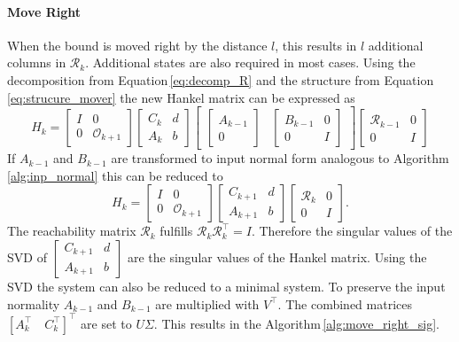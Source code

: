 \documentclass[doctype=mastersthesis,BCOR=15mm,biblatex]{ldvbook}%
\newcommand{\R}{\mathcal{R}} %
\newcommand{\Ob}{\mathcal{O}} %
\newcommand{\eye}{I} %
\begin{document}
\paragraph{Move Right}
When the bound is moved right by the distance $l$, this results in $l$ additional columns in $\R_k$.
Additional states are also required in most cases.
Using the decomposition from Equation\,\ref{eq:decomp_R} and the structure from Equation\,\ref{eq:strucure_mover} the new Hankel matrix can be expressed as
\begin{equation}
	H_k = 
	\begin{bmatrix}
	\eye & 0\\ 0 &\Ob_{k+1}
	\end{bmatrix}
	\begin{bmatrix}
	C_{k} & d\\
	A_{k} & b
	\end{bmatrix}
	\begin{bmatrix}
	\begin{bmatrix}
	A_{k-1} \\
	0
	\end{bmatrix}&
	\begin{bmatrix}
		B_{k-1}&0\\
		0&\eye
	\end{bmatrix}
	\end{bmatrix}
	\begin{bmatrix}
	\R_{k-1} & 0\\ 0& \eye
	\end{bmatrix}
\end{equation}
If $A_{k-1}$ and $B_{k-1}$ are transformed to input normal form analogous to Algorithm\,\ref{alg:inp_normal} this can be reduced to 
\begin{equation}
H_k = 
\begin{bmatrix}
\eye & 0\\ 0 &\Ob_{k+1}
\end{bmatrix}
\begin{bmatrix}
C_{k+1} & d\\
A_{k+1} & b
\end{bmatrix}
\begin{bmatrix}
\R_{k} & 0\\ 0& \eye
\end{bmatrix}
.
\end{equation}
The reachability matrix $\R_{k}$ fulfills $\R_{k} \R_{k}^\top = \eye$.
Therefore the singular values of the SVD of $\begin{bmatrix}
	C_{k+1} & d\\
	A_{k+1} & b
\end{bmatrix}$ are the singular values of the Hankel matrix.
Using the SVD the system can also be reduced to a minimal system. 
To preserve the input normality $A_{k-1}$ and $B_{k-1}$ are multiplied with $V^\top$. The combined matrices $[A_k^\top \quad C_k^\top]^\top$ are set to $U \Sigma$.
This results in the Algorithm\,\ref{alg:move_right_sig}.
\end{document}
